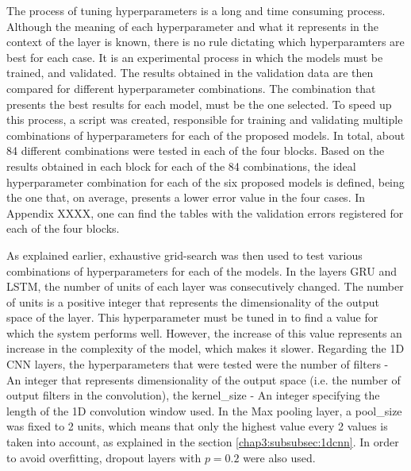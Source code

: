 The process of tuning hyperparameters is a long and time consuming process. Although the meaning of each hyperparameter and what it represents in the context of the layer is known, there is no rule dictating which hyperparamters are best for each case. It is an experimental process in which the models must be trained, and validated. The results obtained in the validation data are then compared for different hyperparameter combinations. The combination that presents the best results for each model, must be the one selected. To speed up this process, a script \cite{} was created, responsible for training and validating multiple combinations of hyperparameters for each of the proposed models. In total, about 84 different combinations were tested in each of the four blocks. Based on the results obtained in each block for each of the 84 combinations, the ideal hyperparameter combination for each of the six proposed models is defined, being the one that, on average, presents a lower error value in the four cases. In Appendix XXXX, one can find the tables with the validation errors registered for each of the four blocks.

As explained earlier, exhaustive grid-search was then used to test various combinations of hyperparameters for each of the models. In the layers \ac{GRU} and \ac{LSTM}, the number of units of each layer was consecutively changed.
The number of units is a positive integer that represents the dimensionality of the output space of the layer. This hyperparameter must be tuned in to find a value for which the system performs well. However, the increase of this value represents an increase in the complexity of the model, which makes it slower. Regarding the \ac{1D CNN} layers, the hyperparameters that were tested were the number of filters - An integer that represents dimensionality of the output space (i.e. the number of output filters in the convolution), the kernel\_size - An integer specifying the length of the 1D convolution window used. In the Max pooling layer, a pool\_size was fixed to 2 units, which means that only the highest value every 2 values is taken into account, as explained in the section \ref{chap3:subsubsec:1dcnn}. In order to avoid overfitting, dropout layers with $p=0.2$ were also used.

